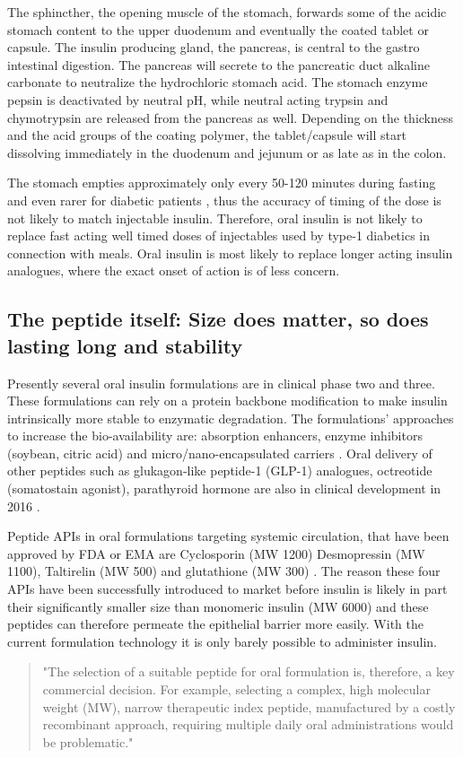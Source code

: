 The sphincther, the opening muscle of the stomach, forwards some of the acidic stomach content to the upper duodenum and eventually the coated tablet or capsule. The insulin producing gland, the pancreas, is central to the gastro intestinal digestion. The pancreas will secrete to the pancreatic duct alkaline carbonate to neutralize the hydrochloric stomach acid. The stomach enzyme pepsin is deactivated by neutral pH, while neutral acting trypsin and chymotrypsin are released from the pancreas as well. Depending on the thickness and the acid groups of the coating polymer, the tablet/capsule will start dissolving immediately in the duodenum and jejunum or as late as in the colon.

The stomach empties approximately only every 50-120 minutes during fasting and even rarer for diabetic patients \cite{silverthorn2010human,corvilain1995effect,gabor2010improving}, thus the accuracy of timing of the dose is not likely to match injectable insulin. Therefore, oral insulin is not likely to replace fast acting well timed doses of injectables used by type-1 diabetics in connection with meals. Oral insulin is most likely to replace longer acting insulin analogues, where the exact onset of action is of less concern.

\subsection{The peptide itself: Size does matter, so does lasting long and stability}
Presently several oral insulin formulations are in clinical phase two and three. These formulations can rely on a protein backbone modification to make insulin intrinsically more stable to enzymatic degradation. The formulations' approaches to increase the bio-availability are: absorption enhancers, enzyme inhibitors (soybean, citric acid) and micro/nano-encapsulated carriers \cite{aguirre2016current}. Oral delivery of other peptides such as glukagon-like peptide-1 (GLP-1) analogues, octreotide (somatostain agonist), parathyroid hormone are also in clinical development in 2016 \cite{aguirre2016current}.

Peptide APIs in oral formulations targeting systemic circulation, that have been approved by FDA or EMA are Cyclosporin (MW 1200) Desmopressin (MW 1100), Taltirelin (MW 500) and glutathione (MW 300) \cite{aguirre2016current}. The reason these four APIs have been successfully introduced to market before insulin is likely in part their significantly smaller size than monomeric insulin (MW 6000) and these peptides can therefore permeate the epithelial barrier more easily. With the current formulation technology it is only barely possible to administer insulin.
\begin{quote}
"The selection of a suitable peptide for oral formulation is, therefore, a key commercial decision. For example, selecting a complex, high molecular weight (MW), narrow therapeutic index peptide, manufactured by a costly recombinant approach, requiring multiple daily oral administrations would be problematic."
\cite{maher2014formulation}
\end{quote}

